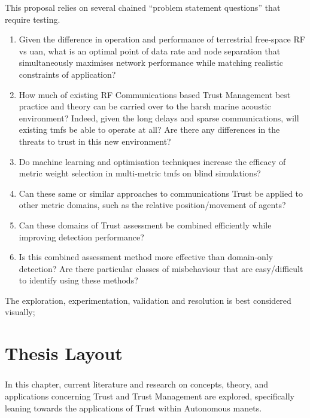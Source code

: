This proposal relies on several chained ``problem statement questions'' that require testing.
\begin{enumerate}[label=\textbf{PSQ.\arabic*},ref=\emph{PSQ. \arabic*}]
	\item Given the difference in operation and performance of terrestrial free-space RF vs \gls{uan}, what is an optimal point of data rate and node separation that simultaneously maximises network performance while matching realistic constraints of application? \label{q:rfuan}
	\item How much of existing RF Communications based Trust Management best practice and theory can be carried over to the harsh marine acoustic environment? Indeed, given the long delays and sparse communications, will existing \glspl{tmf} be able to operate at all? Are there any differences in the threats to trust in this new environment? \label{q:uantmf}
	\item Do machine learning and optimisation techniques increase the efficacy of metric weight selection in multi-metric \glspl{tmf} on blind simulations?\label{q:ml}
	\item Can these same or similar approaches to communications Trust be applied to other metric domains, such as the relative position/movement of agents?\label{q:phys}
	\item Can these domains of Trust assessment be combined efficiently while improving detection performance? \label{q:joint}
	\item Is this combined assessment method more effective than domain-only detection? Are there particular classes of misbehaviour that are easy/difficult to identify using these methods? \label{q:perf}
\end{enumerate}

The exploration, experimentation, validation and resolution is best considered visually;


\section{Thesis Layout}

\subsubsection{}
In this chapter, current literature and research on concepts, theory, and applications concerning Trust and Trust Management are explored, specifically leaning towards the applications of Trust within Autonomous \glspl{manet}.

